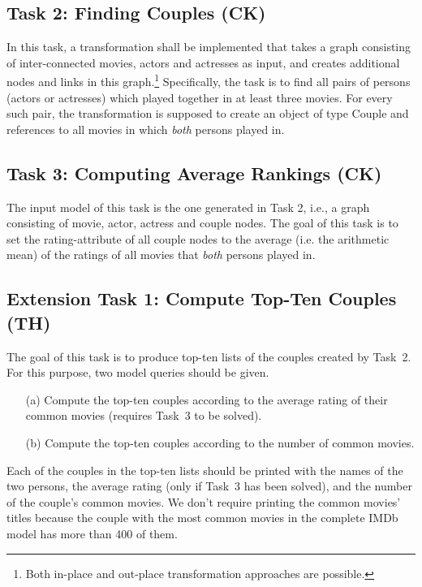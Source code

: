 \documentclass[a4paper,11pt]{article}
\begin{document}
\subsection{Task 2: Finding Couples (CK)}

In this task, a transformation shall be implemented that
takes a graph consisting of inter-connected movies, actors
and actresses as input, and creates additional nodes and 
links in this graph.\footnote{Both in-place and out-place 
transformation approaches are possible.} Specifically,
the task is to find all pairs of persons (actors or actresses)
which played together in at least three movies. For every
such pair, the transformation is supposed to create an
object of type \textsf{Couple} and references to all
movies in which \emph{both} persons played in.


\subsection{Task 3: Computing Average Rankings (CK)}

The input model of this task is the one generated in Task 2,
i.e., a graph consisting of movie, actor, actress and couple
nodes. The goal of this task is to set the rating-attribute
of all couple nodes to the average (i.e. the
arithmetic mean) of the ratings of all movies that
\emph{both} persons played in.

\subsection{Extension Task 1: Compute Top-Ten Couples (TH)}

The goal of this task is to produce top-ten lists of the couples created by
Task~2.  For this purpose, two model queries should be given.

\begin{enumerate}
\item[(a)] Compute the top-ten couples according to the average rating of their
  common movies (requires Task~3 to be solved).
\item[(b)] Compute the top-ten couples according to the number of common
  movies.
\end{enumerate}

Each of the couples in the top-ten lists should be printed with the names of
the two persons, the average rating (only if Task~3 has been solved), and the
number of the couple's common movies.  We don't require printing the common
movies' titles because the couple with the most common movies in the complete
IMDb model has more than 400 of them.
\end{document}
